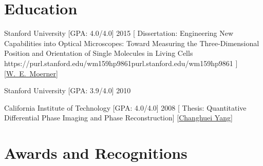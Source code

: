 \documentclass[11pt]{article}
\begin{document}
\section*[Education]{Education}

 {Stanford University} [GPA: 4.0/4.0] {2015} [{%
Dissertation: Engineering New Capabilities into Optical Microscopes: Toward Measuring the Three-Dimensional Position and Orientation of Single Molecules in Living Cells \iconlink{\small\faFileLines} {https://purl.stanford.edu/wm159hp9861}{purl.stanford.edu/wm159hp9861}
}] 
[{\href{https://web.stanford.edu/group/moerner/} {W.\ E.\ Moerner}}]

 {Stanford University} [GPA: 3.9/4.0] {2010} 

 {California Institute of Technology} [GPA: 4.0/4.0] {2008} [{%
Thesis: Quantitative Differential Phase Imaging and Phase Reconstruction}]
[{\href{https://biophot.caltech.edu/} {Changhuei Yang}}] 

\section*[Awards and Recognitions]{Awards and Recognitions}
\end{document}
